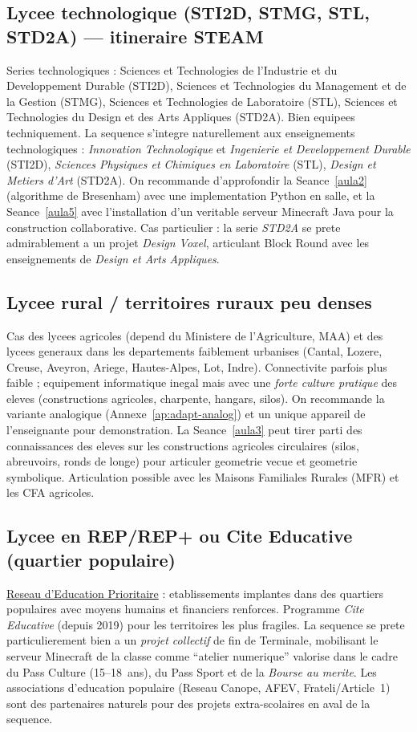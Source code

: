 \documentclass[12pt,a4paper]{scrartcl}
\begin{document}
\subsection{Lycee technologique (STI2D, STMG, STL, STD2A) --- itineraire STEAM}
Series technologiques : Sciences et Technologies de l'Industrie et du Developpement Durable (STI2D), Sciences et Technologies du Management et de la Gestion (STMG), Sciences et Technologies de Laboratoire (STL), Sciences et Technologies du Design et des Arts Appliques (STD2A). Bien equipees techniquement. La sequence s'integre naturellement aux enseignements technologiques : \emph{Innovation Technologique} et \emph{Ingenierie et Developpement Durable} (STI2D), \emph{Sciences Physiques et Chimiques en Laboratoire} (STL), \emph{Design et Metiers d'Art} (STD2A). On recommande d'approfondir la Seance~\ref{aula2} (algorithme de Bresenham) avec une implementation Python en salle, et la Seance~\ref{aula5} avec l'installation d'un veritable serveur Minecraft Java pour la construction collaborative. Cas particulier : la serie \emph{STD2A} se prete admirablement a un projet \emph{Design Voxel}, articulant Block Round avec les enseignements de \emph{Design et Arts Appliques}.

\subsection{Lycee rural / territoires ruraux peu denses}
Cas des lycees agricoles (depend du Ministere de l'Agriculture, MAA) et des lycees generaux dans les departements faiblement urbanises (Cantal, Lozere, Creuse, Aveyron, Ariege, Hautes-Alpes, Lot, Indre). Connectivite parfois plus faible ; equipement informatique inegal mais avec une \emph{forte culture pratique} des eleves (constructions agricoles, charpente, hangars, silos). On recommande la variante analogique (Annexe~\ref{ap:adapt-analog}) et un unique appareil de l'enseignant\textperiodcentered e pour demonstration. La Seance~\ref{aula3} peut tirer parti des connaissances des eleves sur les constructions agricoles circulaires (silos, abreuvoirs, ronds de longe) pour articuler geometrie vecue et geometrie symbolique. Articulation possible avec les Maisons Familiales Rurales (MFR) et les CFA agricoles.

\subsection{Lycee en REP/REP+ ou Cite Educative (quartier populaire)}
\href{https://www.education.gouv.fr/}{Reseau d'Education Prioritaire} : etablissements implantes dans des quartiers populaires avec moyens humains et financiers renforces. Programme \emph{Cite Educative} (depuis 2019) pour les territoires les plus fragiles. La sequence se prete particulierement bien a un \emph{projet collectif} de fin de Terminale, mobilisant le serveur Minecraft de la classe comme \enquote{atelier numerique} valorise dans le cadre du Pass Culture (15--18~ans), du Pass Sport et de la \emph{Bourse au merite}. Les associations d'education populaire (Reseau Canope, AFEV, Frateli/Article~1) sont des partenaires naturels pour des projets extra-scolaires en aval de la sequence.
\end{document}
